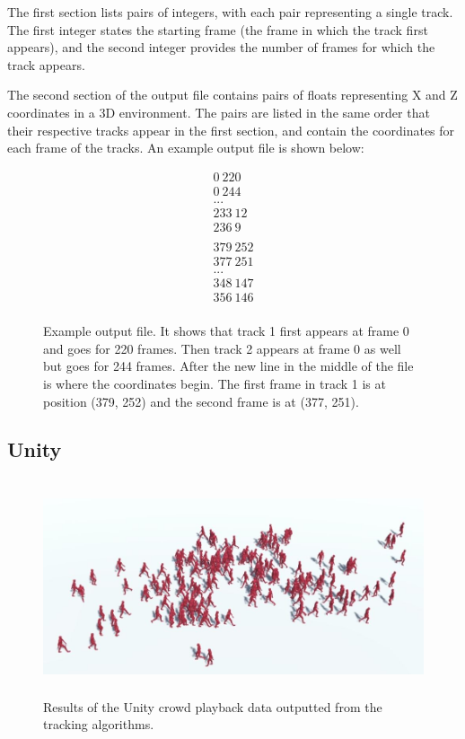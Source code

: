 \documentclass[12pt, onecolumn, conference]{IEEEtran}
\begin{document}
The first section lists pairs of integers, with each pair representing a single track. The first integer states the starting frame (the frame in which the track first appears), and the second integer provides the number of frames for which the track appears. 

The second section of the output file contains pairs of floats representing X and Z coordinates in a 3D environment. The pairs are listed in the same order that their respective tracks appear in the first section, and contain the coordinates for each frame of the tracks. An example output file is shown below:

\begin{figure}
\begin{gather*}
0\ 220 \\
0\ 244 \\
...  \\
233\ 12 \\
236\ 9   \\
 \\
379\ 252 \\
377\ 251 \\
...  \\
348\ 147 \\
356\ 146 \\
\end{gather*}
\caption{Example output file. It shows that track 1 first appears at frame 0 and goes for 220 frames. Then track 2 appears at frame 0 as well but goes for 244 frames. After the new line in the middle of the file is where the coordinates begin. The first frame in track 1 is at position (379, 252) and the second frame is at (377, 251).}
\end{figure}

\subsection{Unity}

\begin{figure}[!t]
\centering
\includegraphics[height=2.5in]{Screenshots/Capture4.JPG}
\caption{Results of the Unity crowd playback data outputted from the tracking algorithms.}
\label{Unity}
\end{figure}
\end{document}
